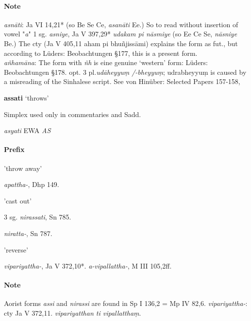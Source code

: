 \documentclass[11pt]{article}
\newcommand*\ṛ{r\symbol{"325}}
\newcommand*\Ṛ{R\symbol{"325}}
\newcommand*\ṝ{r\symbol{"304}\symbol{"325}}
\newcommand*\Ṝ{R\symbol{"304}\symbol{"325}}
\newcommand*\ḷ{l\symbol{"325}}
\newcommand*\ḹ{l\symbol{"304}\symbol{"325}}
\newcommand*\Ḷ{L\symbol{"325}}
\newcommand*\Ḹ{L\symbol{"304}\symbol{"325}}
\begin{document}
\paragraph*{Note}
\textit{asnāti}: Ja VI 14,21* (so Be Se Ce, \textit{asanāti} Ee.) So to read without insertion of vowel "\textit{a}"
1 sg. \textit{asniye}, Ja V 397,29* \textit{udakam pi nāsmiye} (so Ee Ce Se, \textit{nāsniye} Be.)
The cty (Ja V 405,11 aham pi bhuñjissāmi) explains the form as fut.,
but according to Lüders: Beobachtungen §177, this is a present form. \\
\textit{añhamāna}: The form with \textit{ñh} is eine genuine `western' form: Lüders: Beobachtungen §178.
opt. 3 pl.\textit{udāheyyuṃ /-bheyyuṃ};
udrabheyyuṃ is caused by a misreading of the Sinhalese script. See von Hinüber: Selected Papers 157-158, 

%
%
\begin{center}
{\Large
\textbf{assati} `throws'
}
\end{center}
Simplex used only in commentaries and Sadd.
\begin{description}[leftmargin=\parindent]
\item[ety.]
\textit{asyati}
EWA \textit{AS}
\end{description}

\paragraph*{Prefix}
\begin{description}[leftmargin=\parindent]
\item[apa] 'throw away'
\item[ppp.] \textit{apattha-}, Dhp 149.
\item[nir] 'cast out'
\item[pres] 3 sg. \textit{nirassati}, Sn 785.
\item[ppp.] \textit{niratta-}, Sn 787.
\item[vi-pari-] 'reverse'
\item[ppp.] \textit{vipariyattha-}, Ja V 372,10*.
\textit{a-vipallattha-}, M III 105,2ff. 
\end{description}

\paragraph*{Note}
Aorist forms \textit{assi} and \textit{nirassi} are found in Sp I 136,2 = Mp IV 82,6.
\textit{vipariyattha-}: cty Ja V 372,11. \textit{vipariyatthan ti vipallatthaṃ}.
% 




\end{document}
